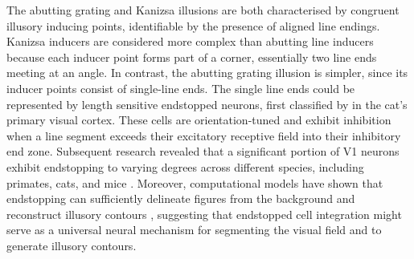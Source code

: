 \documentclass[12pt]{article}
\begin{document}
The abutting grating and Kanizsa illusions are both characterised by congruent illusory inducing points, identifiable by the presence of aligned line endings. Kanizsa inducers are considered more complex than abutting line inducers because each inducer point forms part of a corner, essentially two line ends meeting at an angle. In contrast, the abutting grating illusion is simpler, since its inducer points consist of single-line ends. The single line ends could be represented by length sensitive endstopped neurons, first classified by \textcite{hubelRECEPTIVEFIELDSFUNCTIONAL1965} in the cat's primary visual cortex. These cells are orientation-tuned and exhibit inhibition when a line segment exceeds their excitatory receptive field into their inhibitory end zone.  Subsequent research revealed that a significant portion of V1 neurons exhibit endstopping to varying degrees across different species, including primates, cats, and mice \autocite{deangelisLengthWidthTuning1994,jonesSurroundSuppressionPrimate2001,sceniakVisualSpatialCharacterization2001}. Moreover, computational models have shown that endstopping can sufficiently delineate figures from the background and reconstruct illusory contours \autocite{vonderheydtMechanismsContourPerception1989}, suggesting that endstopped cell integration might serve as a universal neural mechanism for segmenting the visual field and to generate illusory contours.
\bigbreak
\end{document}
